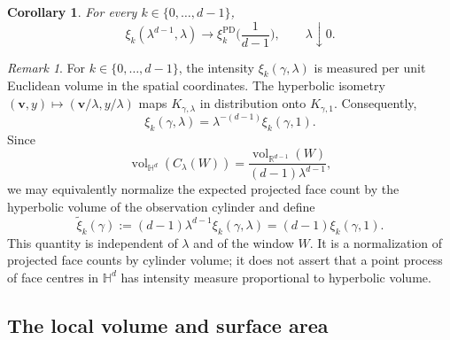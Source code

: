 \documentclass[11pt,a4paper]{article}
\theoremstyle{plain}
\newtheorem{corollary}[theorem]{Corollary}
\theoremstyle{definition}
\theoremstyle{remark}
\newtheorem{remark}[theorem]{Remark}
\newcommand{\vol}{\mathop{\mathrm{vol}}\nolimits}
\newcommand{\bv}{\boldsymbol{v}}
\def\HH{\mathbb{H}}
\def\RR{\mathbb{R}}
\begin{document}
\begin{corollary}\label{cor:AllFaceIntensities}
	For every $k\in\{0,\ldots,d-1\}$,
	\[
		\xi_k(\lambda^{d-1},\lambda)
		\longrightarrow
		\xi_k^{\operatorname{PD}}\Big(\frac{1}{d-1}\Big),\qquad \lambda\downarrow 0.
	\]
\end{corollary}

\begin{remark}\label{rmk:k-intensity_normalized}
For $k\in\{0,\ldots,d-1\}$, the intensity
$\xi_k(\gamma,\lambda)$ is measured per unit Euclidean volume
in the spatial coordinates. The hyperbolic isometry
$(\bv,y)\mapsto(\bv/\lambda,y/\lambda)$ maps
$K_{\gamma,\lambda}$ in distribution onto $K_{\gamma,1}$.
Consequently,
\[
    \xi_k(\gamma,\lambda)
    =\lambda^{-(d-1)}\xi_k(\gamma,1).
\]
Since
\[
    \vol_{\HH^d}(C_\lambda(W))
    =\frac{\vol_{\RR^{d-1}}(W)}{(d-1)\lambda^{d-1}},
\]
we may equivalently normalize the expected projected face count
by the hyperbolic volume of the observation cylinder and define
\[
    \tilde{\xi}_k(\gamma)
    :=(d-1)\lambda^{d-1}\xi_k(\gamma,\lambda)
    =(d-1)\xi_k(\gamma,1).
\]
This quantity is independent of $\lambda$ and of the window $W$.
It is a normalization of projected face counts by cylinder
volume; it does not assert that a point process of face centres
in $\HH^d$ has intensity measure proportional to hyperbolic
volume.
\end{remark}




\subsection{The local volume and surface area}
\end{document}
